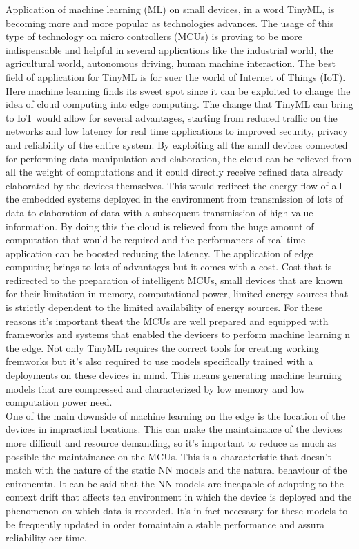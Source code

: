 \documentclass[12pt]{report}
\begin{document}
Application of machine learning (ML) on small devices, in a word TinyML, is becoming more and more popular as technologies advances. The usage of this type of technology on micro controllers (MCUs) is proving to be more indispensable and helpful in several applications like the industrial world, the agricultural world, autonomous driving, human machine interaction. The best field of application for TinyML is for suer the world of Internet of Things (IoT). Here machine learning finds its sweet spot since it can be exploited to change the idea of cloud computing into edge computing. The change that TinyML can bring to IoT would allow for several advantages, starting from reduced traffic on the networks and low latency for real time applications to improved security, privacy and reliability of the entire system. By exploiting all the small devices connected for performing data manipulation and elaboration, the cloud can be relieved from all the weight of computations and it could directly receive refined data already elaborated by the devices themselves. This would redirect the energy flow of all the embedded systems deployed in the environment from transmission of lots of data to elaboration of data with a subsequent transmission of high value information. By doing this the cloud is relieved from the huge amount of computation that would be required and the performances of real time application can be boosted reducing the latency. The application of edge computing brings to lots of advantages but it comes with a cost. Cost that is redirected to the preparation of intelligent MCUs, small devices that are known for their limitation in memory, computational power, limited energy sources that is strictly dependent to the limited availability of energy sources. For these reasons it's important theat the MCUs are well prepared and equipped with frameworks and systems that enabled the devicers to perform machine learning n the edge. Not only TinyML requires the correct tools for creating working fremworks but it's also required to use models specifically trained with a deployments on these devices in mind. This means generating machine learning models that are compressed and characterized by low memory and low computation power need. \\
One of the main downside of machine learning on the edge is the location of the devices in impractical locations. This can make the maintainance of the devices more difficult and resource demanding, so it's important to reduce as much as possible the maintainance on the MCUs. This is a characteristic that doesn't match with the nature of the static NN models and the natural behaviour of the enironemtn. It can be said that the NN models are incapable of adapting to the context drift that affects teh environment in which the device is deployed and the phenomenon on which data is recorded. It's in fact necesasry for these models to be frequently updated in order tomaintain a stable performance and assura reliability oer time.  
\end{document}
